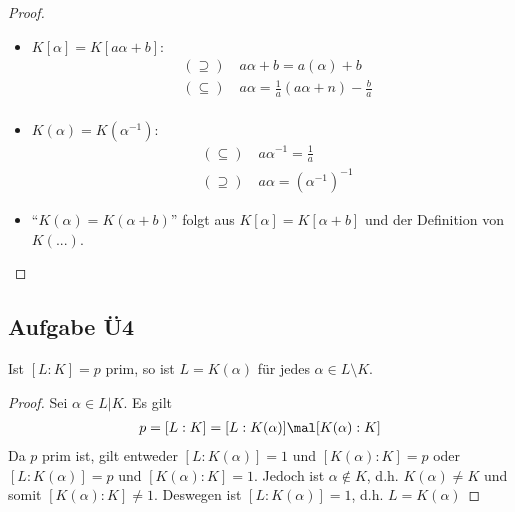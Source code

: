 \begin{proof}
	\begin{itemize}
		\item $K[\alpha] = K[a\alpha + b]:$
		\begin{align*}
			&(\supseteq)\quad a\alpha + b = a(\alpha) + b\\
			&(\subseteq)\quad a\alpha = \frac{1}{a} (a\alpha + n) - \frac{b}{a}\\
		\end{align*}
		\item $K(\alpha) = K(\alpha^{-1}):$
		\begin{align*}
			&(\subseteq)\quad a\alpha^{-1} = \frac{1}{a}\\
			&(\supseteq)\quad a\alpha = (\alpha^{-1})^{-1}
		\end{align*}
		\item ``$K(\alpha) = K(\alpha +b)$'' folgt aus $K[\alpha] = K[\alpha + b]$ und der Definition von $K(...)$. 
	\end{itemize}
\end{proof}

\subsection*{Aufgabe Ü4}
Ist $[L:K] = p$ prim, so ist $L = K(\alpha)$ für jedes $\alpha \in L \setminus K$.

\begin{proof}
	Sei $\alpha \in L \vert K$. Es gilt
	\begin{align*}
		p = [L:K] = [L:K(\alpha)]\mal [K(\alpha):K]
	\end{align*}
	Da $p$ prim ist, gilt entweder $[L:K(\alpha)] = 1$ und $[K(\alpha):K] = p$ oder $[L:K(\alpha)]=p$ und $[K(\alpha):K] = 1$. Jedoch ist $\alpha \not\in K$, d.h. $K(\alpha) \neq K$ und somit $[K(\alpha):K] \neq 1$. Deswegen ist $[L:K(\alpha)] = 1$, d.h. $L = K(\alpha)$
\end{proof}


